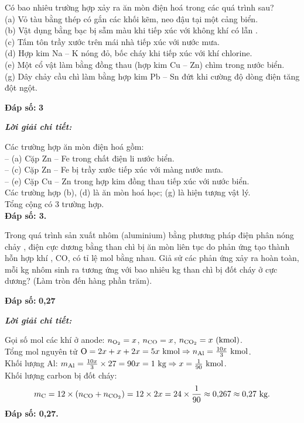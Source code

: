 \documentclass[11pt,a4paper]{article}
\def\loigiai#1{
\par\begingroup\color{blue!80!black}\small
\noindent\textbf{\textit{Lời giải chi tiết:}}\par
#1\par\endgroup}
\begin{document}
\begin{ex}
Có bao nhiêu trường hợp xảy ra ăn mòn điện hoá trong các quá trình sau?\\
(a) Vỏ tàu bằng thép có gắn các khối kẽm, neo đậu tại một cảng biển.\\
(b) Vật dụng bằng bạc bị sẫm màu khi tiếp xúc với không khí có lẫn .\\
(c) Tấm tôn trầy xước trên mái nhà tiếp xúc với nước mưa.\\
(d) Hợp kim Na -- K nóng đỏ, bốc cháy khi tiếp xúc với khí chlorine.\\
(e) Một cổ vật làm bằng đồng thau (hợp kim Cu -- Zn) chìm trong nước biển.\\
(g) Dây chảy cầu chì làm bằng hợp kim Pb -- Sn đứt khi cường độ dòng điện tăng đột ngột.
\par\noindent\textbf{Đáp số:} \textbf{\color{red}3}
\loigiai{
Các trường hợp ăn mòn điện hoá gồm:\\
-- (a) Cặp Zn -- Fe trong chất điện li nước biển.\\
-- (c) Cặp Zn -- Fe bị trầy xước tiếp xúc với màng nước mưa.\\
-- (e) Cặp Cu -- Zn trong hợp kim đồng thau tiếp xúc với nước biển.\\
Các trường hợp (b), (d) là ăn mòn hoá học; (g) là hiện tượng vật lý.\\
Tổng cộng có 3 trường hợp.\\
\textbf{Đáp số: 3.}}
\end{ex}

\begin{ex}
Trong quá trình sản xuất nhôm (aluminium) bằng phương pháp điện phân nóng chảy , điện cực dương bằng than chì bị ăn mòn liên tục do phản ứng tạo thành hỗn hợp khí , CO,  có tỉ lệ mol bằng nhau. Giả sử các phản ứng xảy ra hoàn toàn, mỗi kg nhôm sinh ra tương ứng với bao nhiêu kg than chì bị đốt cháy ở cực dương? (Làm tròn đến hàng phần trăm).
\par\noindent\textbf{Đáp số:} \textbf{\color{red}0,27}
\loigiai{
Gọi số mol các khí ở anode: $n_{\ce{O2}} = x$, $n_{\ce{CO}} = x$, $n_{\ce{CO2}} = x\text{ (kmol)}$.\\
Tổng mol nguyên tử $\ce{O} = 2x + x + 2x = 5x\text{ kmol} \Rightarrow n_{\ce{Al}} = \frac{10x}{3}\text{ kmol}$.\\
Khối lượng Al: $m_{\ce{Al}} = \frac{10x}{3} \times 27 = 90x = 1\text{ kg} \Rightarrow x = \frac{1}{90}\text{ kmol}$.\\
Khối lượng carbon bị đốt cháy:
$$m_{\ce{C}} = 12 \times (n_{\ce{CO}} + n_{\ce{CO2}}) = 12 \times 2x = 24 \times \frac{1}{90} \approx 0{,}267 \approx 0{,}27\text{ kg.}$$
\textbf{Đáp số: 0,27.}}
\end{ex}
\end{document}
